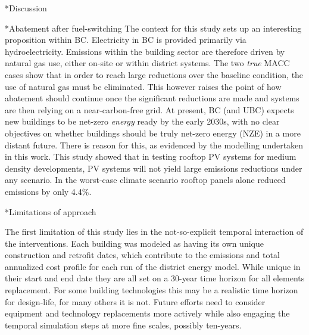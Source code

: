\documentclass[twocolumn, a4paper,10pt]{article}
\makeatletter
\renewcommand\section{\@startsection{section}{1}{\z@}{3pt}{3pt}{\normalfont\large\bfseries}}
\renewcommand\subsection{\@startsection{subsection}{1}{\z@}{\z@}{\z@}{\normalfont\normalsize\bfseries}}
\renewcommand\subsection{\@startsection{subsection}{1}{\z@}{\z@}{0.1pt}{\normalfont\normalsize\bfseries}}
\makeatother
\begin{document}
\section*{Discussion}

\subsection*{Abatement after fuel-switching}
The context for this study sets up an interesting proposition within BC. Electricity in BC is provided primarily via hydroelectricity. Emissions within the building sector are therefore driven by natural gas use, either on-site or within district systems. The two \textit{true} MACC cases show that in order to reach large reductions over the baseline condition, the use of natural gas must be eliminated. This however raises the point of how abatement should continue once the significant reductions are made and systems are then relying on a near-carbon-free grid. At present, BC (and UBC) expects new buildings to be net-zero \textit{energy} ready by the early 2030s, with no clear objectives on whether buildings should be truly net-zero energy (NZE) in a more distant future. There is reason for this, as evidenced by the modelling undertaken in this work. This study showed that in testing rooftop PV systems for medium density developments, PV systems will not yield large emissions reductions under any scenario. In the worst-case climate scenario rooftop panels alone reduced emissions by only 4.4\%. 


\subsection*{Limitations of approach}

The first limitation of this study lies in the not-so-explicit temporal interaction of the interventions. Each building was modeled as having its own unique construction and retrofit dates, which contribute to the emissions and total annualized cost profile for each run of the district energy model. While unique in their start and end date they are all set on a 30-year time horizon for all elements replacement. For some building technologies this may be a realistic time horizon for design-life, for many others it is not. Future efforts need to consider equipment and technology replacements more actively while also engaging the temporal simulation steps at more fine scales, possibly ten-years.
\end{document}
